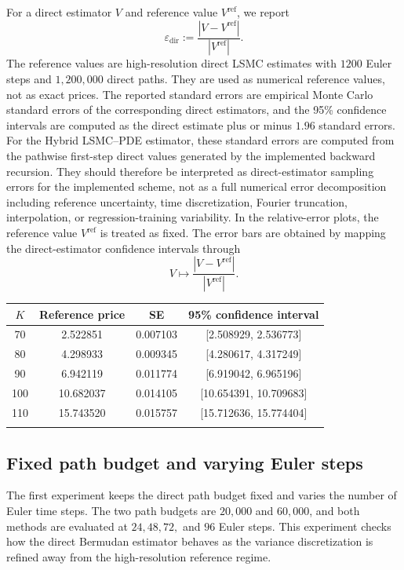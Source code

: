 \documentclass[pdflatex,sn-mathphys-num]{sn-jnl}
\makeatletter
\theoremstyle{thmstyleone}%
\theoremstyle{thmstylethree}%
\theoremstyle{thmstyletwo}%
\renewenvironment{table}[1][]{%
  \par\addvspace{12pt}%
  \noindent\begin{minipage}{\textwidth}%
  \def\@captype{table}%
  \centering%
  \tablebodyfont%
}{%
  \end{minipage}%
  \par\addvspace{12pt}%
}
\makeatother
\begin{document}
For a direct estimator \(V\) and reference value \(V^{\mathrm{ref}}\), we report
\[
    \varepsilon_{\mathrm{dir}}
    :=
    \frac{|V-V^{\mathrm{ref}}|}{|V^{\mathrm{ref}}|}.
\]
The reference values are high-resolution direct LSMC estimates with \(1200\)
Euler steps and \(1{,}200{,}000\) direct paths. They are used as numerical
reference values, not as exact prices. The reported standard errors are empirical
Monte Carlo standard errors of the corresponding direct estimators, and the
95\% confidence intervals are computed as the direct estimate plus or minus
\(1.96\) standard errors. For the Hybrid LSMC--PDE estimator, these standard
errors are computed from the pathwise first-step direct values generated by the
implemented backward recursion. They should therefore be interpreted as
direct-estimator sampling errors for the implemented scheme, not as a full
numerical error decomposition including reference uncertainty, time
discretization, Fourier truncation, interpolation, or regression-training
variability. In the relative-error plots, the reference value
\(V^{\mathrm{ref}}\) is treated as fixed. The error bars are obtained by mapping
the direct-estimator confidence intervals through
\[
    V\mapsto \frac{|V-V^{\mathrm{ref}}|}{|V^{\mathrm{ref}}|}.
\]
\begin{table}[htbp]
\centering
\caption{High-resolution direct LSMC reference values for the baseline numerical specification.}
\label{tab:baseline-reference-prices}
\small
\begin{tabularx}{0.82\textwidth}{@{}cccc@{}}
\toprule
\(K\) & Reference price & SE & 95\% confidence interval \\
\midrule
70 & 2.522851 & 0.007103 & [2.508929, 2.536773] \\
80 & 4.298933 & 0.009345 & [4.280617, 4.317249] \\
90 & 6.942119 & 0.011774 & [6.919042, 6.965196] \\
100 & 10.682037 & 0.014105 & [10.654391, 10.709683] \\
110 & 15.743520 & 0.015757 & [15.712636, 15.774404] \\
\botrule
\end{tabularx}
\end{table}

\subsection{Fixed path budget and varying Euler steps}

The first experiment keeps the direct path budget fixed and varies the number of
Euler time steps. The two path budgets are \(20{,}000\) and \(60{,}000\), and
both methods are evaluated at \(24,48,72,\) and \(96\) Euler steps. This
experiment checks how the direct Bermudan estimator behaves as the variance
discretization is refined away from the high-resolution reference regime.
\end{document}
